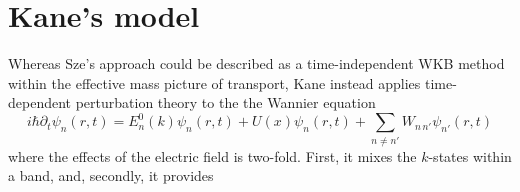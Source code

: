 \section{Kane's model}
Whereas Sze's approach could be described as a time-independent WKB method within the effective mass picture of transport, Kane instead applies time-dependent perturbation theory to the the Wannier equation
$$i\hbar\partial_t\psi_n(r,t)=E_n^0(k)\psi_n(r,t)+U(x)\psi_n(r,t)+\sum_{n\neq n'} W_{n\,n'}\psi_{n'}(r,t)$$
where the effects of the electric field is two-fold.  First, it mixes the $k$-states within a band, and, secondly, it provides 